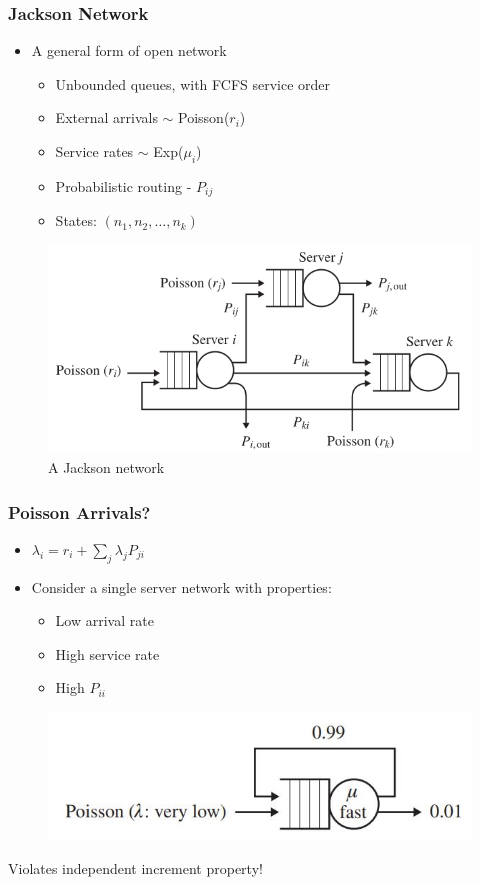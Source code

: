 \documentclass[10pt,notes]{beamer}
\begin{document}
\begin{frame}
    \frametitle{Jackson Network}
    \begin{itemize}
        \item A general form of open network
            \begin{itemize}
                \item Unbounded queues, with FCFS service order
                \item External arrivals \(\sim\) Poisson(\(r_i\))
                \item Service rates \(\sim\) Exp(\(\mu_i\))
                \item Probabilistic routing - \(P_{ij}\)
                \item States: \((n_1, n_2, \ldots, n_k)\)
            \end{itemize}
    \end{itemize}
    \begin{figure}
        \includegraphics[width=0.55\linewidth]{images/jackson_network.png}
        \caption{A Jackson network}
    \end{figure}
\end{frame}

\begin{frame}
    \frametitle{Poisson Arrivals?}
        \begin{itemize}
            \item $\lambda_i = r_i + \sum_j \lambda_j P_{ji}$
            \item Consider a single server network with properties:
            \begin{itemize}
                \item Low arrival rate
                \item High service rate
                \item High \(P_{ii}\)
            \end{itemize}
        \end{itemize}
        \begin{figure}
            \includegraphics[width=0.65\linewidth]{images/independency_network.jpg}
        \end{figure}
        \begin{center} 
            Violates independent increment property!
        \end{center}

\end{frame}
\end{document}
